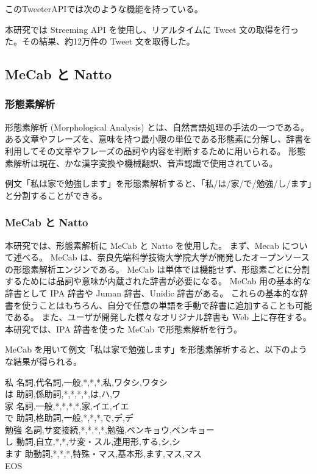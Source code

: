 \documentclass[11pt,a4j]{jsarticle}
\begin{document}
このTweeterAPIでは次のような機能を持っている。

本研究では Streeming API を使用し、リアルタイムに Tweet 文の取得を行った。その結果、約12万件の Tweet 文を取得した。

\subsection{MeCab と Natto}
\subsubsection{形態素解析}
形態素解析 (Morphological Analysis) とは、自然言語処理の手法の一つである。
ある文章やフレーズを、意味を持つ最小限の単位である形態素に分解し、辞書を利用してその文章やフレーズの品詞や内容を判断するために用いられる。
形態素解析は現在、かな漢字変換や機械翻訳、音声認識で使用されている。

例文「私は家で勉強します」を形態素解析すると、「私/は/家/で/勉強/し/ます」と分割することができる。

\subsubsection{MeCab と Natto}
本研究では、形態素解析に MeCab と Natto を使用した。
まず、Mecab について述べる。
MeCab  は、奈良先端科学技術大学院大学が開発したオープンソースの形態素解析エンジンである。
MeCab は単体では機能せず、形態素ごとに分割するためには品詞や意味が内蔵された辞書が必要になる。
MeCab 用の基本的な辞書として IPA 辞書や Juman 辞書、Unidic 辞書がある。
これらの基本的な辞書を使うことはもちろん、自分で任意の単語を手動で辞書に追加することも可能である。
また、ユーザが開発した様々なオリジナル辞書も Web 上に存在する。
本研究では、IPA 辞書を使った MeCab で形態素解析を行う。

MeCab を用いて例文「私は家で勉強します」を形態素解析すると、以下のような結果が得られる。

\begin{itembox}[l]
私  名詞,代名詞,一般,*,*,*,私,ワタシ,ワタシ\\
は  助詞,係助詞,*,*,*,*,は,ハ,ワ\\
家  名詞,一般,*,*,*,*,家,イエ,イエ\\
で  助詞,格助詞,一般,*,*,*,で,デ,デ\\
勉強  名詞,サ変接続,*,*,*,*,勉強,ベンキョウ,ベンキョー\\
し  動詞,自立,*,*,サ変・スル,連用形,する,シ,シ\\
ます  助動詞,*,*,*,特殊・マス,基本形,ます,マス,マス\\
EOS
\end{itembox}
\end{document}
